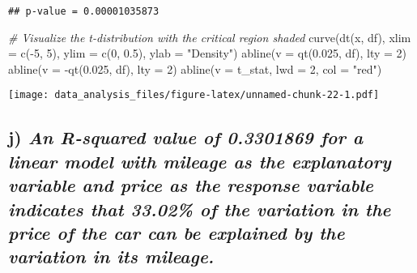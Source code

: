 \documentclass[
]{article}
\newenvironment{Shaded}{\begin{snugshade}}{\end{snugshade}}
\newcommand{\AttributeTok}[1]{\textcolor[rgb]{0.77,0.63,0.00}{#1}}
\newcommand{\CommentTok}[1]{\textcolor[rgb]{0.56,0.35,0.01}{\textit{#1}}}
\newcommand{\DecValTok}[1]{\textcolor[rgb]{0.00,0.00,0.81}{#1}}
\newcommand{\FloatTok}[1]{\textcolor[rgb]{0.00,0.00,0.81}{#1}}
\newcommand{\FunctionTok}[1]{\textcolor[rgb]{0.00,0.00,0.00}{#1}}
\newcommand{\NormalTok}[1]{#1}
\newcommand{\SpecialCharTok}[1]{\textcolor[rgb]{0.00,0.00,0.00}{#1}}
\newcommand{\StringTok}[1]{\textcolor[rgb]{0.31,0.60,0.02}{#1}}
\begin{document}
\begin{verbatim}
## p-value = 0.00001035873
\end{verbatim}

\begin{Shaded}
\begin{Highlighting}[]
\CommentTok{\# Visualize the t{-}distribution with the critical region shaded}
\FunctionTok{curve}\NormalTok{(}\FunctionTok{dt}\NormalTok{(x, df), }\AttributeTok{xlim =} \FunctionTok{c}\NormalTok{(}\SpecialCharTok{{-}}\DecValTok{5}\NormalTok{, }\DecValTok{5}\NormalTok{), }\AttributeTok{ylim =} \FunctionTok{c}\NormalTok{(}\DecValTok{0}\NormalTok{, }\FloatTok{0.5}\NormalTok{), }\AttributeTok{ylab =} \StringTok{"Density"}\NormalTok{)}
\FunctionTok{abline}\NormalTok{(}\AttributeTok{v =} \FunctionTok{qt}\NormalTok{(}\FloatTok{0.025}\NormalTok{, df), }\AttributeTok{lty =} \DecValTok{2}\NormalTok{)}
\FunctionTok{abline}\NormalTok{(}\AttributeTok{v =} \SpecialCharTok{{-}}\FunctionTok{qt}\NormalTok{(}\FloatTok{0.025}\NormalTok{, df), }\AttributeTok{lty =} \DecValTok{2}\NormalTok{)}
\FunctionTok{abline}\NormalTok{(}\AttributeTok{v =}\NormalTok{ t\_stat, }\AttributeTok{lwd =} \DecValTok{2}\NormalTok{, }\AttributeTok{col =} \StringTok{"red"}\NormalTok{)}
\end{Highlighting}
\end{Shaded}

\texttt{[image: data\_analysis\_files/figure-latex/unnamed-chunk-22-1.pdf]}

\hypertarget{j-an-r-squared-value-of-0.3301869-for-a-linear-model-with-mileage-as-the-explanatory-variable-and-price-as-the-response-variable-indicates-that-33.02-of-the-variation-in-the-price-of-the-car-can-be-explained-by-the-variation-in-its-mileage.}{%
\subsection{\texorpdfstring{j) \emph{An R-squared value of 0.3301869 for
a linear model with mileage as the explanatory variable and price as the
response variable indicates that 33.02\% of the variation in the price
of the car can be explained by the variation in its
mileage.}}{j) An R-squared value of 0.3301869 for a linear model with mileage as the explanatory variable and price as the response variable indicates that 33.02\% of the variation in the price of the car can be explained by the variation in its mileage.}}\label{j-an-r-squared-value-of-0.3301869-for-a-linear-model-with-mileage-as-the-explanatory-variable-and-price-as-the-response-variable-indicates-that-33.02-of-the-variation-in-the-price-of-the-car-can-be-explained-by-the-variation-in-its-mileage.}}
\end{document}
